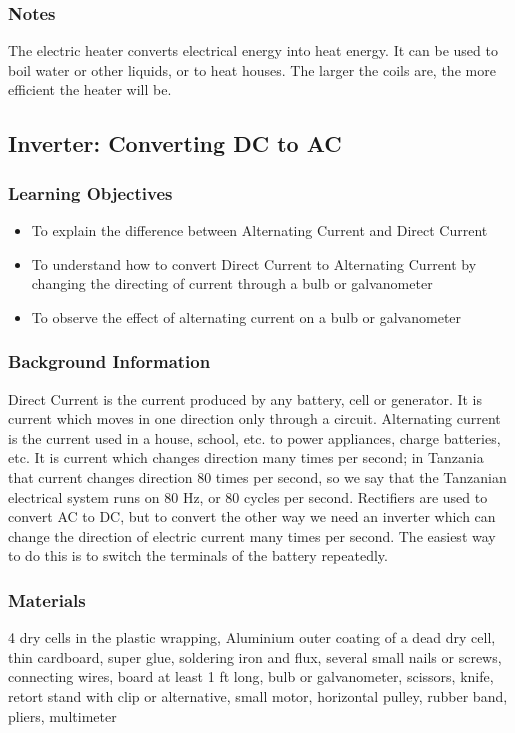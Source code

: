 \subsubsection*{Notes}
The electric heater converts electrical energy into heat energy. It can be used to boil water or other liquids, or to heat houses. The larger the coils are, the more efficient the heater will be.  


\subsection{Inverter: Converting DC to AC}

\subsubsection*{Learning Objectives}
\begin{itemize}
\item{To explain the difference between Alternating Current and Direct Current} 
\item{To understand how to convert Direct Current to Alternating Current by changing the directing of current through a bulb or galvanometer} 
\item{To observe the effect of alternating current on a bulb or galvanometer} 
\end{itemize}

\subsubsection*{Background Information}
Direct Current is the current produced by any battery, cell or generator. It is current which moves in one direction only through a circuit. Alternating current is the current used in a house, school, etc. to power appliances, charge batteries, etc. It is current which changes direction many times per second; in Tanzania that current changes direction 80 times per second, so we say that the Tanzanian electrical system runs on 80 Hz, or 80 cycles per second.  
Rectifiers are used to convert AC to DC, but to convert the other way we need an inverter which can change the direction of electric current many times per second. The easiest way to do this is to switch the terminals of the battery repeatedly.  

\subsubsection*{Materials}
4 dry cells in the plastic wrapping, Aluminium outer coating of a dead dry cell, thin cardboard, super glue, soldering iron and flux, several small nails or screws, connecting wires, board at least 1 ft long, bulb or galvanometer, scissors, knife, retort stand with clip or alternative, small motor, horizontal pulley, rubber band, pliers, multimeter



